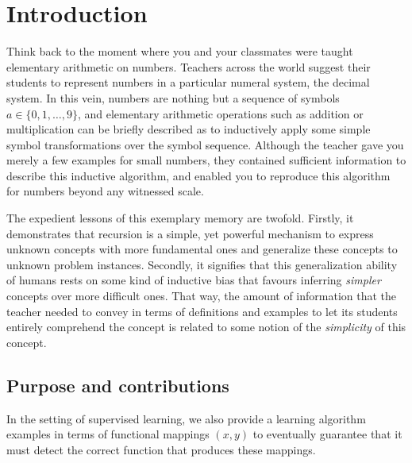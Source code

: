 

\chapter{Introduction} 
Think back to the moment where you and your classmates were taught elementary arithmetic on numbers.
Teachers across the world suggest their students to represent numbers in a particular numeral system, the decimal system.
In this vein, numbers are nothing but a sequence of symbols $a\in\{0,1,\dots,9\}$, and elementary arithmetic operations such as addition or multiplication can be briefly described as to inductively apply some simple symbol transformations over the symbol sequence.
Although the teacher gave you merely a few examples for small numbers, they contained sufficient information to describe this inductive algorithm, and enabled you to reproduce this algorithm for numbers beyond any witnessed scale.

The expedient lessons of this exemplary memory are twofold.
Firstly, it demonstrates that recursion is a simple, yet powerful mechanism to express unknown concepts with more fundamental ones and generalize these concepts to unknown problem instances.
Secondly, it signifies that this generalization ability of humans rests on some kind of inductive bias that favours inferring \textit{simpler} concepts over more difficult ones.
That way, the amount of information that the teacher needed to convey in terms of definitions and examples to let its students entirely comprehend the concept is related to some notion of the \textit{simplicity} of this concept.


\section{Purpose and contributions}
In the setting of supervised learning, we also provide a learning algorithm examples in terms of functional mappings $(x,y)$ to eventually guarantee that it must detect the correct function that produces these mappings.

